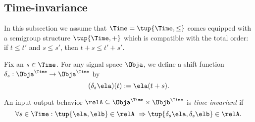 
\subsection{Time-invariance}

In this subsection we assume that $\Time = \tup{\Time, \leq}$ comes equipped with a semigroup structure $\tup{\Time, +}$ which is compatible with the total order: if $t \leq t'$ and $s \leq s'$, then $t + s \leq t' + s'$.

Fix an $s \in \Time$.
For any signal space $\Obja$, we define a shift function $\delta_s: \Obja^\Time \to \Obja^\Time$ by
\begin{equation}
    (\delta_s \ela)(t) := \ela(t + s).
\end{equation}

\begin{definition}
    An input-output behavior $\relA \subseteq \Obja^\Time \times \Objb^\Time$ is \emph{time-invariant} if
    \begin{equation}
        \forall s \in \Time: \tup{\ela, \elb} \in \relA  \ \Rightarrow \tup{\delta_s \ela, \delta_s \elb} \in \relA.
    \end{equation}
\end{definition}






